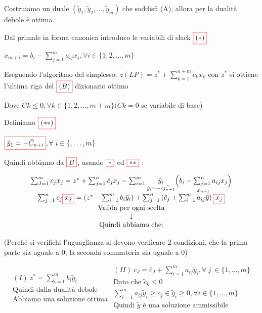 \begin{myproof}
    Costruiamo un duale $\left(\tilde{y}_{1}, \tilde{y}_{2}, \ldots, \tilde{y}_{m}\right)$ che soddisfi (A), allora per la dualità debole è ottima.

    Dal primale in forma canonica introduco le variabili di slack $\fcolorbox{red}{white}{$(*)$}$
    
    $x_{m+i}=b_{i}-\sum_{j=1}^{m} a_{ij}  x_{j}, \forall i \in\{1,2, \ldots, m\}$
    
    Eseguendo l’algoritmo del simplesso: $z(LP)=z^*+\sum^{n+m}_{k=1}\tilde{c}_kx_k$ con $z^*$ si ottiene l’ultima riga del $\fcolorbox{red}{white}{$(B)$}$ dizionario ottimo
    
    Dove $\tilde{C}{k} \leqslant 0, \forall k \in\{1,2, \ldots, m+m\} ( \tilde{C}{k}=0$ se variabile di base)    

    Definiamo $\fcolorbox{red}{white}{$(**)$}$

$\fcolorbox{red}{white}{$\tilde{y}_{1}=-\tilde{C}_{n+i}$}, \forall\ i \in\{, \ldots, m\}$

Quindi abbiamo da $\fcolorbox{red}{white}{$B$}$, usando $\fcolorbox{red}{white}{$*$}$ ed $\fcolorbox{red}{white}{$**$}$ :

\[
    \begin{array}{c}
\sum_{J=1}^m c_j x_j=z^*+\sum_{j=1}^n \tilde{c}_j x_j-\sum_{i=1}^m \underset{\tilde{y}_i=-\tilde{cj_{n+1}}}{\tilde{y}_{i}}\underset{x_{n+1}}{\left(b_i-\sum_{j=1}^n a_{i j} x_j\right)} \\
\sum_{j=1}^n c_j \fcolorbox{red}{white}{$x_j$} =\left(z^*-\sum_{i=1}^m b_i \tilde{y}_i\right)+\sum_{j=1}^n\left(\tilde{c}_j+\sum_{i=1}^m a_{i j} \tilde{y}\right) \fcolorbox{red}{white}{$x_j$}\\
 \text{Valida per ogni scelta} \\
 \downarrow \\
  \text{Quindi abbiamo che:}
    \end{array}
\]

(Perché si verifichi l’uguaglianza si devono verificare 2 condizioni, che la prima parte sia uguale a 0, la seconda sommatoria sia uguale a 0)

\[
    \begin{array}{c}
        (I)\ z^{*}=\sum_{i=1}^{m} b_{i} \tilde{y}_{i} \quad\\
         \text{Quindi dalla dualità debole}\\
          \text{Abbiamo una soluzione ottima}
    \end{array}
    \begin{array}{c}
(II)\ c_{J}=\tilde{c_{J}}+\sum_{i=1}^{m} a_{i j} \tilde{y}_{i}, \forall\ j\ \in \{1, \ldots, m\}\\ 
\text{Dato che }\tilde{c}_k \leqslant 0\\
 \sum_{i=1}^m a_{ij} \tilde{y}_i \geqslant c_j \in \tilde{y}_i \geqslant 0, \forall i \in \{1,\ldots, m \}\\
  \text{Quindi } \tilde{y} \text{ è una soluzione ammissibile}
    \end{array}
\]


\end{myproof}
